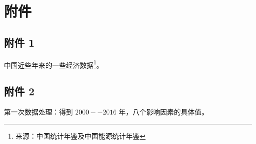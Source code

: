 \section{附件}

  \subsection{附件 1}
    中国近些年来的一些经济数据\footnote{来源：中国统计年鉴及中国能源统计年鉴}。
    \label{ssec:fujian1}

  \subsection{附件 2}
    第一次数据处理：得到 $2000--2016$ 年，八个影响因素的具体值。
    \label{ssec:fujian2}
